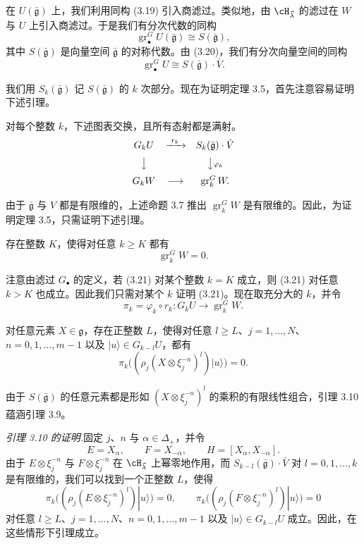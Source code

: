 在 $U(\bar{\mathfrak{g}})$ 上，我们利用同构 (3.19) 引入商滤过。类似地，由 $\cH_{\vec{\lambda}}$ 的滤过在 $W$ 与 $U$ 上引入商滤过。于是我们有分次代数的同构
\[
\operatorname{gr}^G_{\bullet}U(\bar{\mathfrak{g}})\cong S(\bar{\mathfrak{g}}),
\]
其中 $S(\bar{\mathfrak{g}})$ 是向量空间 $\bar{\mathfrak{g}}$ 的对称代数。由 (3.20)，我们有分次向量空间的同构
\[
\operatorname{gr}^G_{\bullet}U\cong S(\bar{\mathfrak{g}})\cdot\bar V.
\]

我们用 $S_k(\bar{\mathfrak{g}})$ 记 $S(\bar{\mathfrak{g}})$ 的 $k$ 次部分。现在为证明定理 3.5，首先注意容易证明下述引理。

\begin{lemma}[3.8]
对每个整数 $k$，下述图表交换，且所有态射都是满射。
\[
\begin{array}{ccc}
G_kU & \xrightarrow{\ r_k\ } & S_k(\bar{\mathfrak{g}})\cdot\bar V\\[6pt]
\big\downarrow & & \big\downarrow{\scriptstyle\varphi_k}\\[6pt]
G_kW & \longrightarrow & \operatorname{gr}^G_k W.
\end{array}
\]
\end{lemma}

由于 $\bar{\mathfrak{g}}$ 与 $V$ 都是有限维的，上述命题 3.7 推出 $\operatorname{gr}^G_k W$ 是有限维的。因此，为证明定理 3.5，只需证明下述引理。

\begin{lemma}[3.9]
存在整数 $K$，使得对任意 $k\ge K$ 都有
\begin{equation}
\operatorname{gr}^G_k W=0. \tag{3.21}
\end{equation}
\end{lemma}

注意由滤过 $G_{\bullet}$ 的定义，若 (3.21) 对某个整数 $k=K$ 成立，则 (3.21) 对任意 $k>K$ 也成立。因此我们只需对某个 $k$ 证明 (3.21)。现在取充分大的 $k$，并令
\[
\pi_k=\varphi_k\circ r_k:G_kU\longrightarrow\operatorname{gr}^G_k W.
\]

\begin{lemma}[3.10]
对任意元素 $X\in\mathfrak{g}$，存在正整数 $L$，使得对任意 $l\ge L$、$j=1,\dots,N$、$n=0,1,\dots,m-1$ 以及 $|u\rangle\in G_{k-l}U$，都有
\[
\pi_k\bigl((\rho_j(X\otimes\xi_j^{-n})^l)|u\rangle\bigr)=0.
\]
\end{lemma}

由于 $S(\bar{\mathfrak{g}})$ 的任意元素都是形如 $(X\otimes\xi_j^{-n})^l$ 的乘积的有限线性组合，引理 3.10 蕴涵引理 3.9。

\noindent\textit{引理 3.10 的证明.}\quad 固定 $j$、$n$ 与 $\alpha\in\Delta_+$，并令
\[
E=X_{\alpha},\qquad F=X_{-\alpha},\qquad H=[X_{\alpha},X_{-\alpha}].
\]
由于 $E\otimes\xi_j^{-n}$ 与 $F\otimes\xi_j^{-n}$ 在 $\cH_{\vec{\lambda}}$ 上幂零地作用，而 $S_{k-l}(\bar{\mathfrak{g}})\cdot\bar V$ 对 $l=0,1,\dots,k$ 是有限维的，我们可以找到一个正整数 $L$，使得
\begin{equation}
\pi_k\bigl((\rho_j(E\otimes\xi_j^{-n})^l)|u\rangle\bigr)=0,\qquad
\pi_k\bigl((\rho_j(F\otimes\xi_j^{-n})^l)|u\rangle\bigr)=0 \tag{3.22}
\end{equation}
对任意 $l\ge L$、$j=1,\dots,N$、$n=0,1,\dots,m-1$ 以及 $|u\rangle\in G_{k-l}U$ 成立。因此，在这些情形下引理成立。


